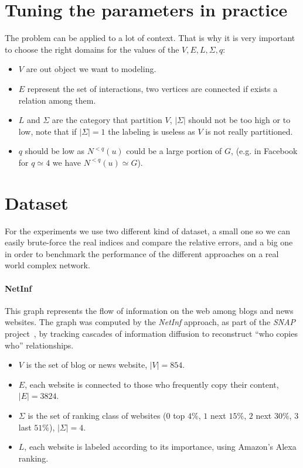     \section{Tuning the parameters in practice}
    
    The problem can be applied to a lot of context.
    That is why it is very important to choose the right domains for the values of the $V, E, L, \Sigma, q$:
    \begin{itemize}
	    \item $V$ are out object we want to modeling.
	    \item $E$ represent the set of interactions, two vertices are connected if exists a relation among them.
	    \item $L$ and $\Sigma$ are the category that partition $V$, $|\Sigma|$ should not be too high or to low, note that if $|\Sigma| = 1$ the labeling is useless as $V$ is not really partitioned.
	    \item $q$ should be low as $N^{<q}(u)$ could be a large portion of $G$, (e.g. in Facebook for $q \simeq 4$ we have $N^{<q}(u) \simeq G$)\cite{Facebook}.
    \end{itemize}
    
    
    \section{Dataset}
    
    For the experiments we use two different kind of dataset, a small one so we can easily brute-force the real indices and compare the relative errors, and a big one in order to benchmark the performance of the different approaches on a real world complex network.
    
    \paragraph*{NetInf} This graph represents the flow of information on the web among blogs and news websites. The graph was computed by the \textit{NetInf} approach, as part of the \textit{SNAP} project~\cite{netinf}, by tracking cascades of information diffusion to reconstruct ``who copies who'' relationships.
    
    \begin{itemize}
    	\item $V$ is the set of blog or news website, $|V| = 854$.
    	\item $E$, each website is connected to those who frequently copy their content, $|E| = 3824$.
    	\item $\Sigma$ is the set of ranking class of websites ($0$ top $4\%$, $1$ next $15\%$, $2$ next $30\%$, $3$ last $51\%$), $|\Sigma| = 4$.
    	\item $L$, each website is labeled according to its importance, using Amazon's Alexa ranking\cite{alexarank}.
    \end{itemize}

